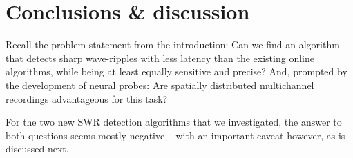 \chapter{Conclusions \& discussion}
\label{ch:conclusions}

Recall the problem statement from the introduction: Can we find an algorithm that detects sharp wave-ripples with less latency than the existing online algorithms, while being at least equally sensitive and precise? And, prompted by the development of neural probes: Are spatially distributed multichannel recordings advantageous for this task?

For the two new SWR detection algorithms that we investigated, the answer to both questions seems mostly negative -- with an important caveat however, as is discussed next.






